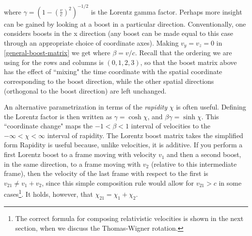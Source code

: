 \documentclass[12pt,a4paper,notitlepage]{report}
\DeclareMathOperator\arctanh{arctanh}
\begin{document}
where $\gamma = (1 - (\frac{v}{c})^2)^{-1/2}$ is the Lorentz gamma factor. Perhaps more insight can be gained by looking at a boost in a particular direction. Conventionally, one considers boosts in the x direction (any boost can be made equal to this case through an appropriate choice of coordinate axes). Making $v_y = v_z = 0$ in \eqref{general-boost-matrix} we get
%
%
where $\beta = v/c$. Recall that the ordering we are using for the rows and columns is $(0, 1, 2, 3)$, so that the boost matrix above has the effect of ``mixing" the time coordinate with the spatial coordinate corresponding to the boost direction, while the other spatial directions (orthogonal to the boost direction) are left unchanged. 

An alternative parametrization in terms of the {\it rapidity} $\chi$ is often useful. Defining
%
\eq{ \chi \equiv \arctanh{\beta},
}
%
the Lorentz factor is then written as $\gamma = \cosh{\chi}$, and $\beta\gamma = \sinh{\chi}$. This ``coordinate change" maps the $-1<\beta<1$ interval of velocities to the $-\infty < \chi < \infty$ interval of rapidity. The Lorentz boost matrix takes the simplified form
%
%
Rapidity is useful because, unlike velocities, it is additive. If you perform a first Lorentz boost to a frame moving with velocity $v_1$ and then a second boost, in the same direction, to a frame moving with $v_2$ (relative to this intermediate frame), then the velocity of the last frame with respect to the first is $v_{21} \neq v_1 + v_2$, since this simple composition rule would allow for $v_{21} > c$ in some cases\footnote{The correct formula for composing relativistic velocities is shown in the next section, when we discuss the Thomas-Wigner rotation.}. It holds, however, that $\chi_{21} = \chi_1 + \chi_2$.
\end{document}
